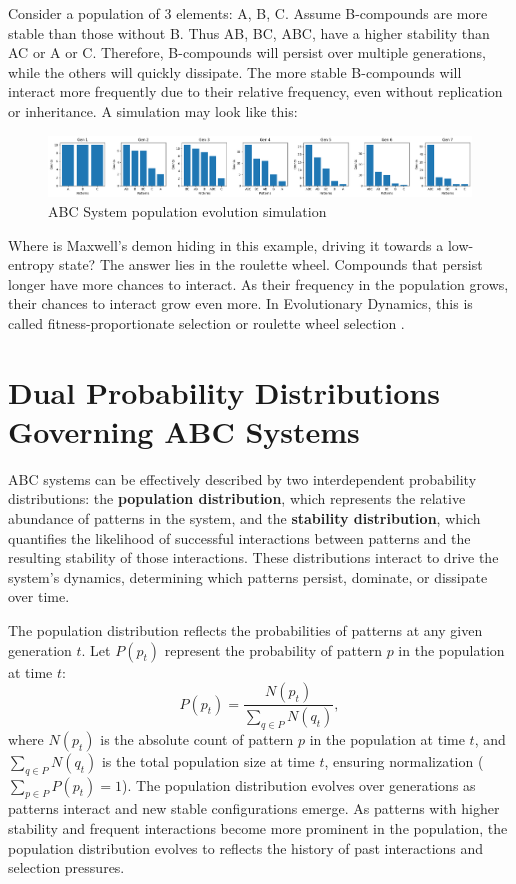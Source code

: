 \documentclass[entropy,article,submit,pdftex,moreauthors]{Definitions/mdpi}
\begin{document}
Consider a population of 3 elements: {A, B, C}. Assume B-compounds are more stable than those without B. Thus AB, BC, ABC, have a higher stability than AC or A or C. Therefore, B-compounds will persist over multiple generations, while the others will quickly dissipate. The more stable B-compounds will interact more frequently due to their relative frequency, even without replication or inheritance. A simulation may look like this:

\begin{figure}[htp]
    \centering
    \includegraphics[width=13cm]{pat_1}
    \caption{ABC System population evolution simulation}
    \label{fig:pat_1}
\end{figure}

Where is Maxwell's demon \cite{leff2002maxwell} hiding in this example, driving it towards a low-entropy state? The answer lies in the roulette wheel. Compounds that persist longer have more chances to interact. As their frequency in the population grows, their chances to interact grow even more. In Evolutionary Dynamics, this is called fitness-proportionate selection \cite{back1996evolutionary} or roulette wheel selection \cite{goldberg1989genetic} \cite{holland1975adaptation}.

\section{Dual Probability Distributions Governing ABC Systems}

ABC systems can be effectively described by two interdependent probability distributions: the \textbf{population distribution}, which represents the relative abundance of patterns in the system, and the \textbf{stability distribution}, which quantifies the likelihood of successful interactions between patterns and the resulting stability of those interactions. These distributions interact to drive the system's dynamics, determining which patterns persist, dominate, or dissipate over time.

The population distribution reflects the probabilities of patterns at any given generation \( t \). Let \( P(p_t) \) represent the probability of pattern \( p \) in the population at time \( t \):
\[
P(p_t) = \frac{N(p_t)}{\sum_{q \in P} N(q_t)},
\]
where \( N(p_t) \) is the absolute count of pattern \( p \) in the population at time \( t \), and \( \sum_{q \in P} N(q_t) \) is the total population size at time \( t \), ensuring normalization (\( \sum_{p \in P} P(p_t) = 1 \)). The population distribution evolves over generations as patterns interact and new stable configurations emerge. As patterns with higher stability and frequent interactions become more prominent in the population, the population distribution evolves to reflects the history of past interactions and selection pressures.
\end{document}
